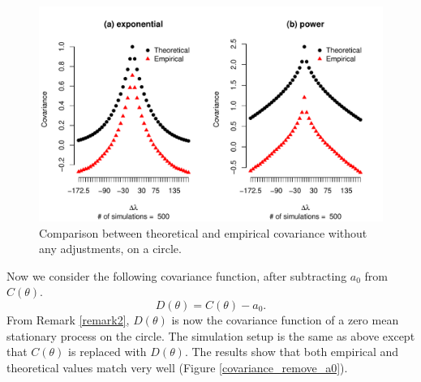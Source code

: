       \begin{figure}[H]
      	\centering
       	\includegraphics[keepaspectratio, scale = .8]{graphs/covariance_circle.pdf}
      	\caption[Comparison Between Theoretical and Empirical Covariance Without] {Comparison between theoretical and empirical covariance without any adjustments, on a circle. }
      	\label{covariance_circle}
      \end{figure}
Now we consider the following covariance function, after subtracting $a_0$ from $C(\theta)$.
	      \[
	      	D(\theta) = C(\theta) - a_0.
	      \]
From Remark \ref{remark2}, $D(\theta)$ is now the covariance function of a zero mean stationary process on the circle. The simulation setup is the same as above except that $C(\theta)$ is replaced with $D(\theta)$. The results show that both empirical and theoretical values match very well (Figure \ref{covariance_remove_a0}). 

